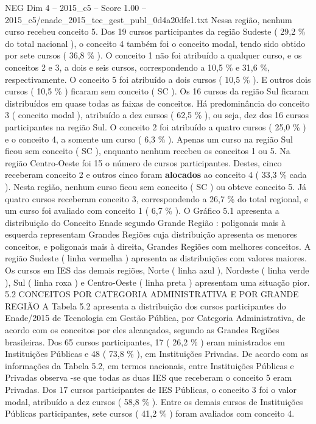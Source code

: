 \begin{textsample}{NEG Dim 4 – 2015\_c5 – Score 1.00 – 2015\_c5/enade\_2015\_tec\_gest\_publ\_0d4a20dfe1.txt}
Nessa região, nenhum curso recebeu conceito 5.
Dos 19 cursos participantes da região Sudeste ( 29,2 \% do total nacional ), o conceito 4 também foi o conceito modal, tendo sido obtido por sete cursos ( 36,8 \% ).
O conceito 1 não foi atribuído a qualquer curso, e os conceitos 2 e 3, a dois e seis cursos, correspondendo a 10,5 \% e 31,6 \%, respectivamente.
O conceito 5 foi atribuído a dois cursos ( 10,5 \% ).
E outros dois cursos ( 10,5 \% ) ficaram sem conceito ( SC ).
Os 16 cursos da região Sul ficaram distribuídos em quase todas as faixas de conceitos.
Há predominância do conceito 3 ( conceito modal ), atribuído a dez cursos ( 62,5 \% ), ou seja, dez dos 16 cursos participantes na região Sul.
O conceito 2 foi atribuído a quatro cursos ( 25,0 \% ) e o conceito 4, a somente um curso ( 6,3 \% ).
Apenas um curso na região Sul ficou sem conceito ( SC ), enquanto nenhum recebeu os conceitos 1 ou 5.
Na região Centro-Oeste foi 15 o número de cursos participantes.
Destes, cinco receberam conceito 2 e outros cinco foram \textbf{alocados} ao conceito 4 ( 33,3 \% cada ).
Nesta região, nenhum curso ficou sem conceito ( SC ) ou obteve conceito 5.
Já quatro cursos receberam conceito 3, correspondendo a 26,7 \% do total regional, e um curso foi avaliado com conceito 1 ( 6,7 \% ).
O Gráfico 5.1 apresenta a distribuição do Conceito Enade segundo Grande Região : poligonais mais à esquerda representam Grandes Regiões cuja distribuição apresenta os menores conceitos, e poligonais mais à direita, Grandes Regiões com melhores conceitos.
A região Sudeste ( linha vermelha ) apresenta as distribuições com valores maiores.
Os cursos em IES das demais regiões, Norte ( linha azul ), Nordeste ( linha verde ), Sul ( linha roxa ) e Centro-Oeste ( linha preta ) apresentam uma situação pior. 5.2 CONCEITOS POR CATEGORIA ADMINISTRATIVA E POR GRANDE REGIÃO A Tabela 5.2 apresenta a distribuição dos cursos participantes do Enade/2015 de Tecnologia em Gestão Pública, por Categoria Administrativa, de acordo com os conceitos por eles alcançados, segundo as Grandes Regiões brasileiras.
Dos 65 cursos participantes, 17 ( 26,2 \% ) eram ministrados em Instituições Públicas e 48 ( 73,8 \% ), em Instituições Privadas.
De acordo com as informações da Tabela 5.2, em termos nacionais, entre Instituições Públicas e Privadas observa -se que todas as duas IES que receberam o conceito 5 eram Privadas.
Dos 17 cursos participantes de IES Públicas, o conceito 3 foi o valor modal, atribuído a dez cursos ( 58,8 \% ).
Entre os demais cursos de Instituições Públicas participantes, sete cursos ( 41,2 \% ) foram avaliados com conceito 4.

\end{textsample}

